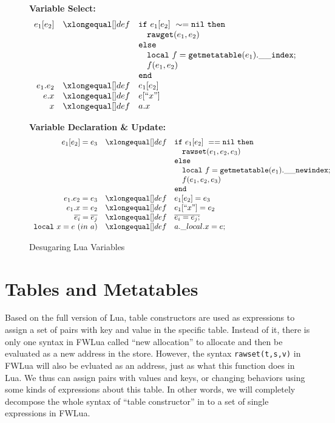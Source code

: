 \begin{figure}
\caption{Desugaring Lua Variables}\label{fig:desLuaVar}
{\bf Variable Select:}\[
\begin{array}{rclcl}
\desugar{e_1[e_2]}{{\tt if}~ e_1[e_2] ~\sim= {\tt nil} ~ {\tt then}\\}
\desugarline{ 
     \quad{\tt rawget}(e_1, e_2) ~\\
     {\tt else}\\
     \quad{\tt local}~f = {\tt getmetatable}(e_1).{\tt{\_}{\_}index};\\
     \quad f(e_1,e_2)\\ 
     {\tt end}
     }
\desugar{e_1.e_2}{e_1[e_2]}
\desugar{e.x}{e[``x"]}
\desugar{x}{a.x}
\end{array}\]

{\bf Variable Declaration \& Update:}\[
\begin{array}{rclcl}
\desugar{e_1[e_2]=e_3}{
    {\tt if}~ e_1[e_2] ~== {\tt nil} ~ {\tt then}\\
}
\desugarline{  
     \quad{\tt rawset}(e_1, e_2,e_3) ~\\
     {\tt else}\\
     \quad{\tt local}~f = {\tt getmetatable}(e_1).{\tt{\_}{\_}newindex};\\
     \quad f(e_1,e_2,e_3)\\ 
     {\tt end}\\
}
\desugar{e_1.e_2=e_3}{e_1[e_2] = e_3}
\desugar{e_1.x=e_2}{e_1[``x"] = e_2}
\desugar{\overline{e_i}=\overline{e_j}}{\overline{e_i = e_j;}}
\desugar{{\tt local}~x=e~(in~a)}{a.\_local.x = e;}

\end{array}\]
\end{figure}

\section{Tables and Metatables}\label{sec:TranslateTabls}
Based on the full version of Lua, table constructors are used as expressions to assign a set of pairs with key and value in the specific table. Instead of it, there is only one syntax in FWLua called ``new allocation'' to allocate and then be evaluated as a new address in the store. 
However, the syntax {\tt rawset(t,s,v)} in FWLua will also be evluated as an address, just as what this function does in Lua.  We thus can assign pairs with values and keys, or changing behaviors using some kinds of expressions about this table. In other words, we will completely decompose the whole syntax of ``table constructor'' in to a set of single expressions in FWLua. 

